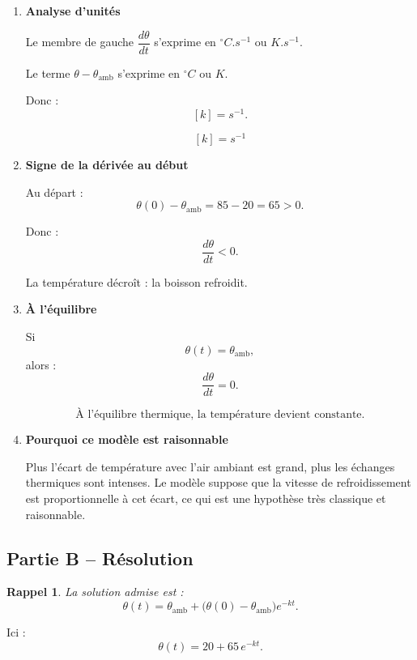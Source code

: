 \documentclass[11pt,a4paper]{article}
\newtheorem*{rappel}{Rappel}
\begin{document}
\begin{enumerate}[label=\textbf{2.\arabic*}, leftmargin=1.6em]

\item \textbf{Analyse d’unités}

Le membre de gauche \(\dfrac{d\theta}{dt}\) s’exprime en \(\si{^\circ C.s^{-1}}\) ou \(\si{K.s^{-1}}\).

Le terme \(\theta-\theta_{\mathrm{amb}}\) s’exprime en \(\si{^\circ C}\) ou \(\si{K}\).

Donc :
\[
[k]=\si{s^{-1}}.
\]

\[
\boxed{[k]=\si{s^{-1}}}
\]

\item \textbf{Signe de la dérivée au début}

Au départ :
\[
\theta(0)-\theta_{\mathrm{amb}}=85-20=65>0.
\]

Donc :
\[
\frac{d\theta}{dt}<0.
\]

La température décroît : la boisson refroidit.

\item \textbf{À l’équilibre}

Si
\[
\theta(t)=\theta_{\mathrm{amb}},
\]
alors :
\[
\frac{d\theta}{dt}=0.
\]

\[
\boxed{\text{À l’équilibre thermique, la température devient constante.}}
\]

\item \textbf{Pourquoi ce modèle est raisonnable}

Plus l’écart de température avec l’air ambiant est grand, plus les échanges thermiques sont intenses.  
Le modèle suppose que la vitesse de refroidissement est proportionnelle à cet écart, ce qui est une hypothèse très classique et raisonnable.

\end{enumerate}

\subsection*{Partie B -- Résolution}

\begin{rappel}
La solution admise est :
\[
\theta(t)=\theta_{\mathrm{amb}}+\big(\theta(0)-\theta_{\mathrm{amb}}\big)e^{-kt}.
\]
\end{rappel}

Ici :
\[
\theta(t)=20+65\,e^{-kt}.
\]
\end{document}
